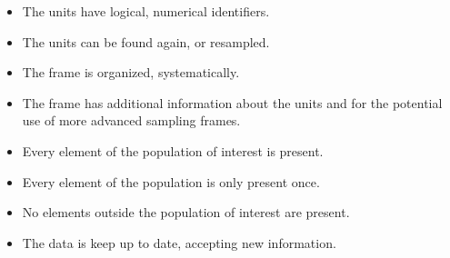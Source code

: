 \begin{itemize}
  \begin{itemize}
      \item The units have logical, numerical identifiers.
      \item The units can be found again, or resampled.
      \item The frame is organized, systematically.
      \item The frame has additional information about the units and for the potential use of more advanced sampling frames.
      \item Every element of the population of interest is present.
      \item Every element of the population is only present once.
      \item No elements outside the population of interest are present.
      \item The data is keep up to date, accepting new information.
  \end{itemize}
  

\end{itemize}
